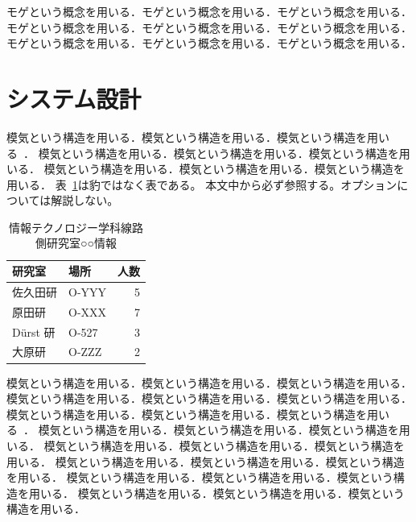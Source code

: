 モゲという概念を用いる．モゲという概念を用いる．モゲという概念を用いる．
モゲという概念を用いる．モゲという概念を用いる．モゲという概念を用いる．
モゲという概念を用いる．モゲという概念を用いる．モゲという概念を用いる．

\section{システム設計}
\label{subsec:app_yy}

模気という構造を用いる．模気という構造を用いる．模気という構造を用いる~\cite{richardson2008restful}．
模気という構造を用いる．模気という構造を用いる．模気という構造を用いる．
模気という構造を用いる．模気という構造を用いる．模気という構造を用いる．
表~\ref{tab:情テク}は豹ではなく表である。
本文中から必ず参照する。オプションについては解説しない。

\begin{table}[htbp]
 \caption{情報テクノロジー学科線路側研究室○○情報}
 \label{tab:情テク}
 \centering
  \begin{tabular}{l|lr}
  \hline
  研究室 & 場所 & 人数\\
  \hline
  佐久田研 & O-YYY & 5 \\
  原田研 & O-XXX & 7 \\
  D\"urst 研 & O-527 & 3\\
  大原研 & O-ZZZ & 2 \\
  \hline
 \end{tabular}
\end{table}

模気という構造を用いる．模気という構造を用いる．模気という構造を用いる．
模気という構造を用いる．模気という構造を用いる．模気という構造を用いる．
模気という構造を用いる．模気という構造を用いる．模気という構造を用いる~\cite{sasada2005yarv}．
模気という構造を用いる．模気という構造を用いる．模気という構造を用いる．
模気という構造を用いる．模気という構造を用いる．模気という構造を用いる．
模気という構造を用いる．模気という構造を用いる．模気という構造を用いる．
模気という構造を用いる．模気という構造を用いる．模気という構造を用いる．
模気という構造を用いる．模気という構造を用いる．模気という構造を用いる．
